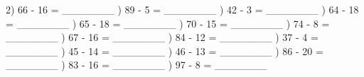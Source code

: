 \documentclass{article}%
\begin{document}
2) 66 {-} 16 = \_\_\_\_\_\_\_%
\newline%
\newline%
) 89 {-} 5 = \_\_\_\_\_\_\_%
\newline%
\newline%
) 42 {-} 3 = \_\_\_\_\_\_\_%
\newline%
\newline%
) 64 {-} 18 = \_\_\_\_\_\_\_%
\newline%
\newline%
) 65 {-} 18 = \_\_\_\_\_\_\_%
\newline%
\newline%
) 70 {-} 15 = \_\_\_\_\_\_\_%
\newline%
\newline%
) 74 {-} 8 = \_\_\_\_\_\_\_%
\newline%
\newline%
) 67 {-} 16 = \_\_\_\_\_\_\_%
\newline%
\newline%
) 84 {-} 12 = \_\_\_\_\_\_\_%
\newline%
\newline%
) 37 {-} 4 = \_\_\_\_\_\_\_%
\newline%
\newline%
) 45 {-} 14 = \_\_\_\_\_\_\_%
\newline%
\newline%
) 46 {-} 13 = \_\_\_\_\_\_\_%
\newline%
\newline%
) 86 {-} 20 = \_\_\_\_\_\_\_%
\newline%
\newline%
) 83 {-} 16 = \_\_\_\_\_\_\_%
\newline%
\newline%
) 97 {-} 8 = \_\_\_\_\_\_\_%
\newline%
\end{document}
